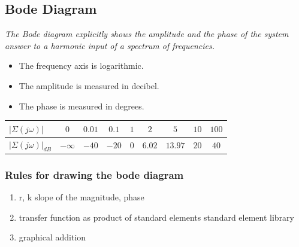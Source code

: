 \documentclass[10pt,a4paper]{scrartcl}
\begin{document}
\begin{multicols*}{3}
	
	
	\subsection{Bode Diagram}
	
	\emph{The Bode diagram explicitly shows the amplitude and the phase of the system answer to a harmonic input of a spectrum of frequencies.}
	
	\begin{itemize}
	\item
	The frequency axis is logarithmic.
	\item
	The amplitude is measured in decibel.
	\item
	The phase is measured in degrees.
	\end{itemize}
	
	
	
	\begin{tabular}{|l|c|c|c|c|c|c|c|c|}
	\hline
	$|\Sigma(j\omega)|$&$0$&$0.01$&$0.1$&$1$&$2$&$5$&$10$&$100$\\
	\hline
	$|\Sigma(j\omega)|_{dB}$&$-\infty$&$-40$&$-20$&$0$&$6.02$&$13.97$&$20$&$40$\\
	\hline
	\end{tabular}
	
	
	
	
	\subsubsection{Rules for drawing the bode diagram}
	
	\begin{enumerate}
	\compaq
	\item
	r, k \dahe slope of the magnitude, phase
	\item
	transfer function as product of standard elements \dahe standard element library
	\item
	graphical addition
	

\end{enumerate}
\end{multicols*}
\end{document}
